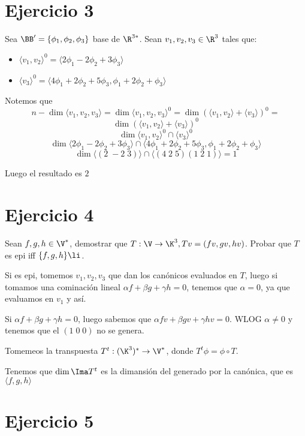 \documentclass{article}
\begin{document}
\section*{Ejercicio 3}
Sea $\BB' = \{\phi_1, \phi_2, \phi_3\}$ base de $\R^{3*}$. Sean $v_1, v_2, v_3
\in \R^3$ tales que:

\begin{itemize}
	\item $\langle v_1, v_2 \rangle ^0 = \langle 2\phi_1-2\phi_2+3\phi_3 \rangle$
	\item $\langle v_3 \rangle ^0 = \langle 4\phi_1+2\phi_2+5\phi_3, \phi_1 +
		2\phi_2 + \phi_3 \rangle$
\end{itemize}

Notemos que \[n-\dim \langle v_1, v_2, v_3 \rangle = \dim \langle v_1, v_2,
v_3 \rangle^0 = \dim (\langle v_1, v_2 \rangle + \langle v_3 \rangle)^0 = \]
\[\dim(\langle v_1, v_2 \rangle + \langle v_3 \rangle)^0 \]
\[\dim\langle v_1, v_2 \rangle^0 \cap \langle v_3 \rangle^0\]
\[\dim\langle 2\phi_1-2\phi_2+3\phi_3 \rangle \cap \langle 4\phi_1+2\phi_2
	+5\phi_3, \phi_1 +
2\phi_2 + \phi_3 \rangle\]
\[\dim\langle (2 \; -2 \; 3) \rangle \cap \langle (4 \; 2 \; 5) (1 \; 2 \; 1)
\rangle = 1\]

Luego el resultado es $2$

\section*{Ejercicio 4}
Sean $f,g,h \in \V^*$, demostrar que $T : \V \to \K^3, Tv = (fv, gv,
hv)$. Probar que $T$ es epi iff $\{f, g, h\} \li$.

Si es epi, tomemos $v_1, v_2, v_3$ que dan los canónicos evaluados en $T$,
luego si tomamos una cominación lineal $\alpha f + \beta g + \gamma h = 0$,
tenemos que $\alpha = 0$, ya que evaluamos en $v_1$ y así.

Si $\alpha f + \beta g + \gamma h = 0$, luego sabemos que $\alpha fv + \beta gv
+ \gamma hv = 0$. WLOG $\alpha \neq 0$ y tenemos que el $(1 \; 0 \; 0)$ no se
genera.

Tomemeos la transpuesta $T^t : (\K^3)^* \to \V^*$, donde $T^t \phi = \phi \circ
T$.

Tenemos que $\dim \Ima T^t$ es la dimansión del generado por la canónica, que
es $\langle f, g, h \rangle$

\section*{Ejercicio 5}
\end{document}
